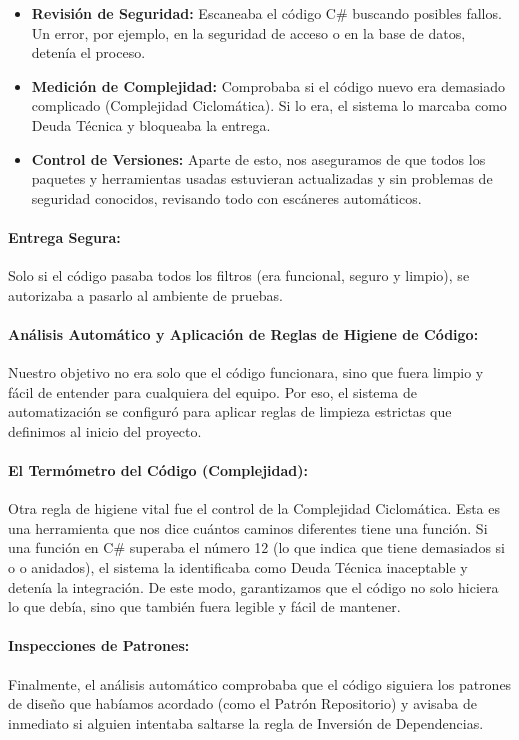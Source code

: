 \begin{itemize}
\item \textbf{Revisión de Seguridad:} Escaneaba el código C\# buscando posibles fallos. Un error, por ejemplo, en la seguridad de acceso o en la base de datos, detenía el proceso.

\item \textbf{Medición de Complejidad:} Comprobaba si el código nuevo era demasiado complicado (Complejidad Ciclomática). Si lo era, el sistema lo marcaba como Deuda Técnica y bloqueaba la entrega.

\item \textbf{Control de Versiones:} Aparte de esto, nos aseguramos de que todos los paquetes y herramientas usadas estuvieran actualizadas y sin problemas de seguridad conocidos, revisando todo con escáneres automáticos.
\end{itemize}

\paragraph{Entrega Segura:} Solo si el código pasaba todos los filtros (era funcional, seguro y limpio), se autorizaba a pasarlo al ambiente de pruebas.

\paragraph{Análisis Automático y Aplicación de Reglas de Higiene de Código:}

Nuestro objetivo no era solo que el código funcionara, sino que fuera limpio y fácil de entender para cualquiera del equipo. Por eso, el sistema de automatización se configuró para aplicar reglas de limpieza estrictas que definimos al inicio del proyecto.

\paragraph{El Termómetro del Código (Complejidad):} Otra regla de higiene vital fue el control de la Complejidad Ciclomática. Esta es una herramienta que nos dice cuántos caminos diferentes tiene una función. Si una función en C\# superaba el número 12 (lo que indica que tiene demasiados si o o anidados), el sistema la identificaba como Deuda Técnica inaceptable y detenía la integración. De este modo, garantizamos que el código no solo hiciera lo que debía, sino que también fuera legible y fácil de mantener.

\paragraph{Inspecciones de Patrones:} Finalmente, el análisis automático comprobaba que el código siguiera los patrones de diseño que habíamos acordado (como el Patrón Repositorio) y avisaba de inmediato si alguien intentaba saltarse la regla de Inversión de Dependencias.

